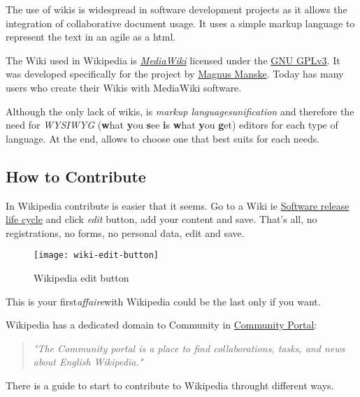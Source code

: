\par The use of wikis is widespread in software development projects as it allows the integration of collaborative document usage. It uses a simple markup language to represent the text in an agile as a html.

\par The Wiki used in Wikipedia is \textit{\href{http://www.mediawiki.org/wiki/MediaWiki}{MediaWiki}} licensed under the \href{http://www.gnu.org/licenses/gpl.html}{GNU GPLv3}. It was developed specifically for the project by \href{http://magnusmanske.de/}{Magnus Manske}. Today has many users who create their Wikis with MediaWiki software.

\par Although the only lack of wikis, is \textit{markup languages​​ unification} and therefore the need for \textit{WYSIWYG} (\textbf{w}hat \textbf{y}ou \textbf{s}ee \textbf{i}s \textbf{w}hat \textbf{y}ou \textbf{g}et) editors for each type of language. At the end, allows to choose one that best suits for each needs.

\subsection{How to Contribute}

\par In Wikipedia contribute is easier that it seems. Go to a Wiki ie \href{http://en.wikipedia.org/wiki/Software_release_life_cycle}{Software release life cycle} and click \textit{edit} button, add your content and save. That's all, no registrations, no forms, no personal data, edit and save.

\begin{figure}[htp]
\centering
\texttt{[image: wiki-edit-button]}
\caption{Wikipedia edit button}
\label{wiki-edit}
\end{figure}

\par This is your first\textit{affaire}with Wikipedia could be the last only if you want.

Wikipedia has a dedicated domain to Community in \href{http://en.wikipedia.org/wiki/Wikipedia:Community_portal}{Community Portal}:
\begin{quote}
    \textit{"The Community portal is a place to find collaborations, tasks, and news about English Wikipedia."}
\end{quote}

\par There is a guide to start to contribute to Wikipedia throught different ways.

